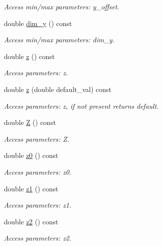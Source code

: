 \begin{DoxyCompactItemize}
\begin{DoxyCompactList}\small\item\em Access min/max parameters\+: y\+\_\+offset. \end{DoxyCompactList}\item 
double \hyperlink{struct_d_d4hep_1_1_x_m_l_1_1_child_value_a80243a2d575edd40cd06be9f8593c9d4}{dim\+\_\+y} () const
\begin{DoxyCompactList}\small\item\em Access min/max parameters\+: dim\+\_\+y. \end{DoxyCompactList}\item 
double \hyperlink{struct_d_d4hep_1_1_x_m_l_1_1_child_value_ab312a1587614170eda32f3d73676321a}{z} () const
\begin{DoxyCompactList}\small\item\em Access parameters\+: z. \end{DoxyCompactList}\item 
double \hyperlink{struct_d_d4hep_1_1_x_m_l_1_1_child_value_aabfe8f00f8f802f2416eab42fb606182}{z} (double default\+\_\+val) const
\begin{DoxyCompactList}\small\item\em Access parameters\+: z, if not present returns default. \end{DoxyCompactList}\item 
double \hyperlink{struct_d_d4hep_1_1_x_m_l_1_1_child_value_adec6095e2e95fe6051a444861177f74b}{Z} () const
\begin{DoxyCompactList}\small\item\em Access parameters\+: Z. \end{DoxyCompactList}\item 
double \hyperlink{struct_d_d4hep_1_1_x_m_l_1_1_child_value_a3ee0d2bf19020a3570a9957379824ca0}{z0} () const
\begin{DoxyCompactList}\small\item\em Access parameters\+: z0. \end{DoxyCompactList}\item 
double \hyperlink{struct_d_d4hep_1_1_x_m_l_1_1_child_value_ad2bac93b7474e4ad40a3e782d44c02d1}{z1} () const
\begin{DoxyCompactList}\small\item\em Access parameters\+: z1. \end{DoxyCompactList}\item 
double \hyperlink{struct_d_d4hep_1_1_x_m_l_1_1_child_value_a80540d279243a15e0ea3c16d56aaa9d9}{z2} () const
\begin{DoxyCompactList}\small\item\em Access parameters\+: z2. \end{DoxyCompactList}\item 

\end{DoxyCompactItemize}
